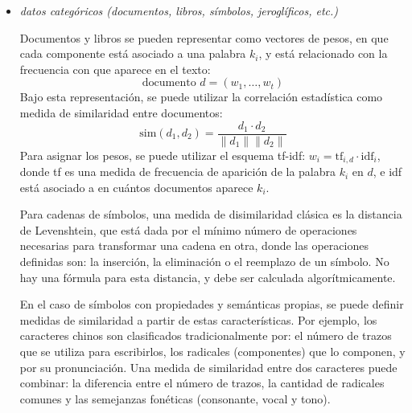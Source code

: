 \documentclass[spanish]{article}
\newcommand{\pregunta}{\textit}
\newcommand{\norm}[1]{\lVert#1\rVert}
\begin{document}
\begin{itemize}
        \item \pregunta{datos categóricos
            (documentos, libros, símbolos, jeroglíficos, etc.)}

            Documentos y libros se pueden representar como vectores de pesos, en que cada componente
            está asociado a una palabra $k_i$, y está relacionado con la frecuencia con que aparece en el
            texto:
            \begin{equation}
                \text{documento $d$} = (w_1, \ldots, w_t)
            \end{equation}
            Bajo esta representación, se puede utilizar la correlación estadística como medida de
            similaridad entre documentos:
            \begin{equation}
                \text{sim}(d_1, d_2) = \frac{d_1\cdot d_2}{\norm{d_1}\norm{d_2}}
            \end{equation}
            Para asignar los pesos, se puede utilizar el esquema tf-idf:  $w_i =
            \text{tf}_{i,d}\cdot\text{idf}_i$, donde tf es una medida de
            frecuencia de aparición de la palabra $k_i$ en $d$, e idf está
            asociado a en cuántos documentos aparece $k_i$.~\footnotemark


            Para cadenas de símbolos, una medida de disimilaridad clásica es la distancia de
            Levenshtein, que está dada por el mínimo número de operaciones necesarias para
            transformar una cadena en otra, donde las operaciones definidas son: la inserción, la
            eliminación o el reemplazo de un símbolo.  No hay una fórmula para esta distancia, y
            debe ser calculada algorítmicamente.

            En el caso de símbolos con propiedades y semánticas propias, se puede definir medidas de
            similaridad a partir de estas características.  Por ejemplo, los caracteres chinos son
            clasificados tradicionalmente por: el número de trazos que se utiliza para escribirlos,
            los radicales (componentes) que lo componen, y por su pronunciación.  Una medida de
            similaridad entre dos caracteres puede combinar: la diferencia entre el número de
            trazos, la cantidad de radicales comunes y las semejanzas fonéticas (consonante, vocal y
            tono).

    \end{itemize}
\end{document}
